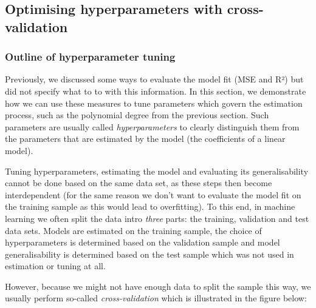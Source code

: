 \documentclass{scrartcl}
\begin{document}
    \begin{center}
    \end{center}
    

\hypertarget{optimising-hyperparameters-with-cross-validation}{%
\subsection{Optimising hyperparameters with
cross-validation}\label{optimising-hyperparameters-with-cross-validation}}

\hypertarget{outline-of-hyperparameter-tuning}{%
\subsubsection{Outline of hyperparameter
tuning}\label{outline-of-hyperparameter-tuning}}

Previously, we discussed some ways to evaluate the model fit (MSE and
R²) but did not specify what to to with this information. In this
section, we demonstrate how we can use these measures to tune parameters
which govern the estimation process, such as the polynomial degree from
the previous section. Such parameters are usually called
\emph{hyperparameters} to clearly distinguish them from the parameters
that are estimated by the model (\eg the coefficients of a linear
model).

Tuning hyperparameters, estimating the model and evaluating its
generalisability cannot be done based on the same data set, as these
steps then become interdependent (for the same reason we don't want to
evaluate the model fit on the training sample as this would lead to
overfitting). To this end, in machine learning we often split the data
intro \emph{three} parts: the training, validation and test data sets.
Models are estimated on the training sample, the choice of
hyperparameters is determined based on the validation sample and model
generalisability is determined based on the test sample which was not
used in estimation or tuning at all.

However, because we might not have enough data to split the sample this
way, we usually perform so-called \emph{cross-validation} which is
illustrated in the figure below:
\end{document}
